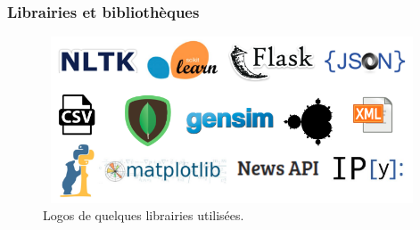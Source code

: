         \subsubsection{Librairies et bibliothèques}
            \begin{figure}[h]
                    \centering
                    \includegraphics[height=140pt,width=320pt]{img/chapter4/tools/tools.png}
                    \caption{Logos de quelques librairies utilisées.}
                    \label{}
            \end{figure}
